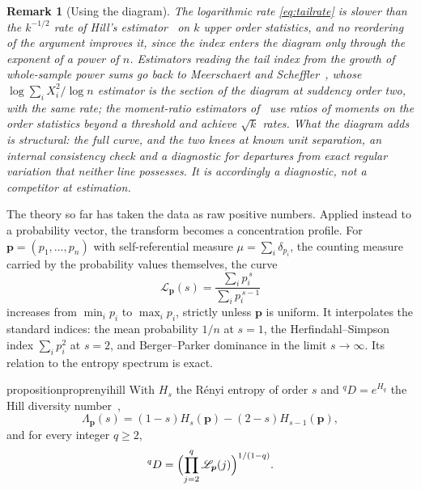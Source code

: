 \documentclass[sn-mathphys-num]{sn-jnl}
\theoremstyle{thmstyleone}%
\theoremstyle{thmstyletwo}%
\newtheorem{remark}{Remark}%
\theoremstyle{thmstylethree}%
\theoremstyle{thmstyleone}%
\providecommand{\Leh}{\mathscr{L}}
\providecommand{\pp}{\boldsymbol p}
\begin{document}
	\begin{remark}[Using the diagram]\label{rem:hill}
		The logarithmic rate \eqref{eq:tailrate} is slower than the
		$k^{-1/2}$ rate of Hill's estimator~\cite{hill1975} on $k$
		upper order statistics, and no reordering of the argument
		improves it, since the index enters the diagram only through the
		exponent of a power of $n$. Estimators reading the tail index
		from the growth of whole-sample power sums go back to
		Meerschaert and Scheffler~\cite{meerschaert1998}, whose
		$\log\sum_iX_i^{2}/\log n$ estimator is the section of the
		diagram at suddency order two, with the same rate; the
		moment-ratio estimators of~\cite{danielsson1996,dekkers1989}
		use ratios of moments on the order statistics beyond a
		threshold and achieve $\sqrt k$ rates. What the diagram adds is
		structural: the full curve, and the two knees at known unit
		separation, an internal consistency check and a diagnostic for
		departures from exact regular variation that neither line
		possesses. It is accordingly a diagnostic, not a competitor at
		estimation.
	\end{remark}
	
	The theory so far has taken the data as raw positive numbers. Applied
	instead to a probability vector, the
	transform becomes a concentration profile. For
	$\pp=(p_1,\dots,p_n)$ with self-referential measure
	$\mu=\sum_i\delta_{p_i}$, the counting measure carried by the
	probability values themselves, the curve
	\begin{equation}\label{eq:profile}
		\Leh_{\pp}(s)=\frac{\sum_ip_i^{\,s}}{\sum_ip_i^{\,s-1}}
	\end{equation}
	increases from $\min_ip_i$ to $\max_ip_i$, strictly unless $\pp$
	is uniform. It interpolates the standard indices: the mean
	probability $1/n$ at $s=1$, the Herfindahl--Simpson index
	$\sum_ip_i^2$ at $s=2$, and Berger--Parker dominance in the limit
	$s\to\infty$. Its relation to the entropy
	spectrum is exact.
	
	\begin{restatable}{proposition}{proprenyihill}\label{prop:renyihill}
		With $H_s$ the R\'enyi entropy of order $s$ and
		${}^{q}D=e^{H_q}$ the Hill diversity
		number~\cite{renyi1961,hillnumbers1973},
		\begin{equation}\label{eq:renyi}
			\Lambda_{\pp}(s)=(1-s)H_s(\pp)-(2-s)H_{s-1}(\pp),
		\end{equation}
		and for every integer $q\ge2$,
		\begin{equation}\label{eq:hillnumber}
			{}^{q}D=\Bigl(\prod_{j=2}^{q}\Leh_{\pp}(j)\Bigr)^{1/(1-q)} .
		\end{equation}
	\end{restatable}
	
\end{document}

